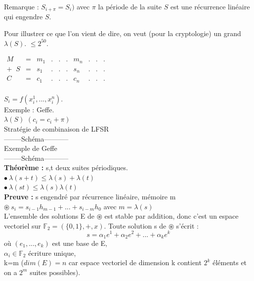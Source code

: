 \documentclass[12pt,a4paper]{article}
\begin{document}
	Remarque : $S_{i + \pi} = S_i)$ avec $\pi$ la période de la suite $S$ est une récurrence linéaire qui engendre $S$.
	
	Pour illustrer ce que l'on vient de dire, on veut (pour la cryptologie) un grand  $\lambda (S)$. $\leq2^{50}$.	
	
\bigskip
	
\begin{center}
$\begin{array}{rccccccccc} 
      M & = & m_1 & . & . & . & m_n & . & . & .\\
+\;\; S & = & s_1 & . & . & . & s_n & . & . & .\\
\hline
      C & = & c_1 & . & . & . & c_n & . & . & .\\
\end{array}$
\end{center}	

$S_i=f(x_i^1,...,x_i^n)$.\\
Exemple : Geffe.\\

$\lambda(S)$ $(c_i=c_i+\pi)$\\

Stratégie de combinaison de LFSR\\
--------Schéma-----------\\


Exemple de Geffe\\
--------Schéma-----------\\

\medskip
\textbf{Théorème :} s,t deux suites périodiques.\\
\hspace*{2cm}$\bullet\ \lambda(s+t) \leq \lambda(s)+\lambda(t)$\\
\hspace*{2cm}$\bullet\ \lambda(st) \leq \lambda(s)\lambda(t)$\\

\textbf{Preuve :} s engendré par récurrence linéaire, mémoire m\\
$\circledast\ s_i=s_{i-1}h_{m-1}+...+s_{i-m}h_0$	\hspace*{1cm} avec $m=\lambda(s)$\\
L'ensemble des solutions E de $\circledast$ est stable par addition, donc c'est un espace vectoriel sur $\mathds{F}_2 = (\{0,1\},+,x)$. Toute solution s de $\circledast$ s'écrit : \\
$$s=\alpha_1e^1+\alpha_2e^2+...+\alpha_ke^k$$ 
où $(e_1,...,e_k) $ est une base de E, \\
$\alpha_i \in \mathds{F}_2$ écriture unique,\\
k=m ($dim(E)=n$ car espace vectoriel de dimension k contient $2^k$ éléments et on a $2^m$ suites possibles).\\
\end{document}
